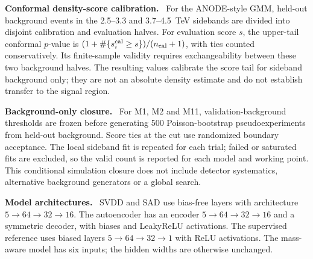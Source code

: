 \documentclass[11pt,a4paper]{article}
\newcommand{\runin}[1]{\par\vspace{2pt}\textbf{#1.}\ }
\begin{document}
\runin{Conformal density-score calibration}
For the ANODE-style GMM, held-out background events in the 2.5--3.3 and
3.7--4.5~TeV sidebands are divided into disjoint calibration and evaluation halves.
For evaluation score $s$, the upper-tail conformal $p$-value is
$(1+\#\{s_i^{\rm cal}\geq s\})/(n_{\rm cal}+1)$, with ties counted
conservatively. Its finite-sample validity requires exchangeability between these
two background halves.\cite{ShaferVovk2008} The resulting values calibrate the score
tail for sideband background only; they are not an absolute density estimate and
do not establish transfer to the signal region.

\runin{Background-only closure}
For M1, M2 and M11, validation-background thresholds are frozen before generating
500 Poisson-bootstrap pseudoexperiments from held-out background. Score ties at the
cut use randomized boundary acceptance. The local sideband fit is repeated for each
trial; failed or saturated fits are excluded, so the valid count is reported for
each model and working point. This conditional simulation closure does not include
detector systematics, alternative background generators or a global search.

\runin{Model architectures}
SVDD and SAD use bias-free layers with architecture
$5 \to 64 \to 32 \to 16$. The autoencoder has an encoder
$5 \to 64 \to 32 \to 16$ and a symmetric decoder, with biases and
LeakyReLU activations. The supervised reference uses biased layers
$5 \to 64 \to 32 \to 1$ with ReLU activations. The mass-aware model
has six inputs; the hidden widths are otherwise unchanged.
\end{document}
